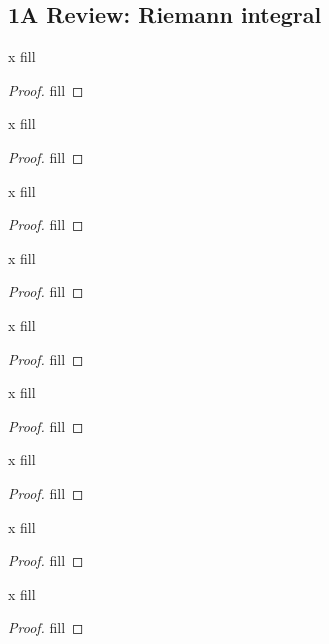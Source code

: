 \subsection{1A Review: Riemann integral}

\begin{exercise}{x}
fill
\end{exercise}
\begin{proof}
fill
\end{proof} 

\begin{exercise}{x}
fill
\end{exercise}
\begin{proof}
fill
\end{proof} 

\begin{exercise}{x}
fill
\end{exercise}
\begin{proof}
fill
\end{proof} 

\begin{exercise}{x}
fill
\end{exercise}
\begin{proof}
fill
\end{proof} 

\begin{exercise}{x}
fill
\end{exercise}
\begin{proof}
fill
\end{proof} 

\begin{exercise}{x}
fill
\end{exercise}
\begin{proof}
fill
\end{proof} 

\begin{exercise}{x}
fill
\end{exercise}
\begin{proof}
fill
\end{proof} 

\begin{exercise}{x}
fill
\end{exercise}
\begin{proof}
fill
\end{proof} 

\begin{exercise}{x}
fill
\end{exercise}
\begin{proof}
fill
\end{proof} 

